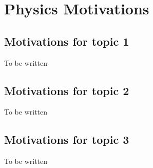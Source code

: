 
\chapter{Physics Motivations}
\label{chap:physics}

\section{Motivations for topic 1}
To be written

\section{Motivations for topic 2}
To be written

\section{Motivations for topic 3}
To be written

